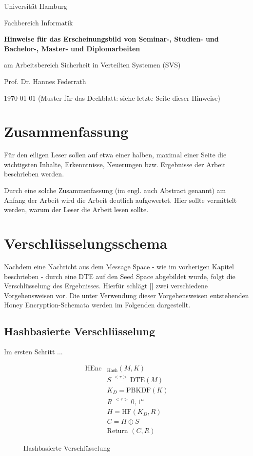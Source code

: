 \documentclass[12pt]{scrartcl}
\begin{document}
\newpage
\thispagestyle{empty}
\begin{center}\Large
Universität Hamburg \par
Fachbereich Informatik
\vfill
{\Large\textsf{\textbf{Hinweise für das Erscheinungsbild von Seminar-, Studien- und Bachelor-, Master- und Diplomarbeiten}}\par} 
\bigskip
am Arbeitsbereich Sicherheit in Verteilten Systemen (SVS) \par
\bigskip
Prof. Dr. Hannes Federrath \par
\bigskip
\today
\vfill
\vfill 
(Muster für das Deckblatt: siehe letzte Seite dieser Hinweise)
\end{center}

\newpage
\section*{Zusammenfassung}

Für den eiligen Leser sollen auf etwa einer halben, maximal einer Seite die wichtigsten Inhalte, Erkenntnisse, Neuerungen bzw. Ergebnisse der Arbeit beschrieben werden. 

Durch eine solche Zusammenfassung (im engl. auch Abstract genannt) am Anfang der Arbeit wird die Arbeit deutlich aufgewertet. Hier sollte vermittelt werden, warum der Leser die Arbeit lesen sollte.

\newpage
\tableofcontents

\newpage
\section{Verschlüsselungsschema}

Nachdem eine Nachricht aus dem Message Space - wie im vorherigen Kapitel beschrieben - durch eine DTE auf den Seed Space abgebildet wurde, folgt die Verschlüsselung des Ergebnisses. Hierfür schlägt [\cite{EURO2014}] zwei verschiedene Vorgehensweisen vor. Die unter Verwendung dieser Vorgehensweisen entstehenden Honey Encryption-Schemata werden im Folgenden dargestellt.

\subsection{Hashbasierte Verschlüsselung}

Im ersten Schritt ...

\begin{figure}[h]
	\begin{align*}
		\text{HEnc}&_{\text{Hash}}(M, K)\\
		&S \overset{<r>}{=} \text{DTE}(M)\\ 	%
		&K_D = \text{PBKDF}(K)\\ 		%
		&R \overset{<r>}{=} {0,1}^n\\	%
		&H = \text{HF}(K_D,R)\\	%
		&C = H \oplus S\\	%
		&\text{Return } (C,R)
	\end{align*}
	\caption{Hashbasierte Verschlüsselung}
	\label{fig:HashEnc}
\end{figure}
\end{document}

